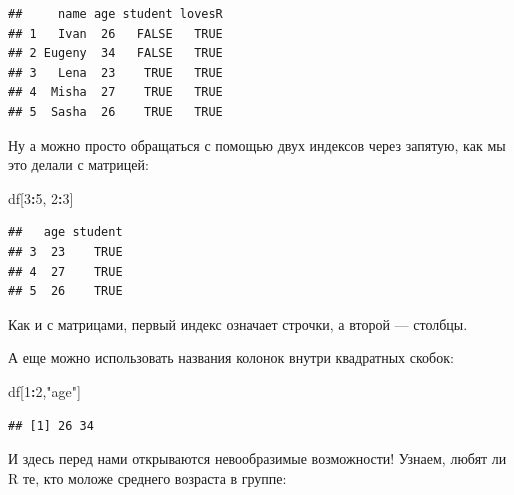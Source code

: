 \documentclass[]{book}
\newenvironment{Shaded}{\begin{snugshade}}{\end{snugshade}}
\newcommand{\CommentTok}[1]{\textcolor[rgb]{0.56,0.35,0.01}{\textit{#1}}}
\newcommand{\DecValTok}[1]{\textcolor[rgb]{0.00,0.00,0.81}{#1}}
\newcommand{\KeywordTok}[1]{\textcolor[rgb]{0.13,0.29,0.53}{\textbf{#1}}}
\newcommand{\NormalTok}[1]{#1}
\newcommand{\OperatorTok}[1]{\textcolor[rgb]{0.81,0.36,0.00}{\textbf{#1}}}
\newcommand{\OtherTok}[1]{\textcolor[rgb]{0.56,0.35,0.01}{#1}}
\newcommand{\StringTok}[1]{\textcolor[rgb]{0.31,0.60,0.02}{#1}}
\begin{document}
\begin{Shaded}
\end{Shaded}

\begin{verbatim}
##     name age student lovesR
## 1   Ivan  26   FALSE   TRUE
## 2 Eugeny  34   FALSE   TRUE
## 3   Lena  23    TRUE   TRUE
## 4  Misha  27    TRUE   TRUE
## 5  Sasha  26    TRUE   TRUE
\end{verbatim}

Ну а можно просто обращаться с помощью двух индексов через запятую, как мы это делали с матрицей:

\begin{Shaded}
\begin{Highlighting}[]
\NormalTok{df[}\DecValTok{3}\OperatorTok{:}\DecValTok{5}\NormalTok{, }\DecValTok{2}\OperatorTok{:}\DecValTok{3}\NormalTok{]}
\end{Highlighting}
\end{Shaded}

\begin{verbatim}
##   age student
## 3  23    TRUE
## 4  27    TRUE
## 5  26    TRUE
\end{verbatim}

Как и с матрицами, первый индекс означает строчки, а второй --- столбцы.

А еще можно использовать названия колонок внутри квадратных скобок:

\begin{Shaded}
\begin{Highlighting}[]
\NormalTok{df[}\DecValTok{1}\OperatorTok{:}\DecValTok{2}\NormalTok{,}\StringTok{"age"}\NormalTok{]}
\end{Highlighting}
\end{Shaded}

\begin{verbatim}
## [1] 26 34
\end{verbatim}

И здесь перед нами открываются невообразимые возможности! Узнаем, любят ли R те, кто моложе среднего возраста в группе:

\begin{Shaded}
\end{Shaded}
\end{document}
